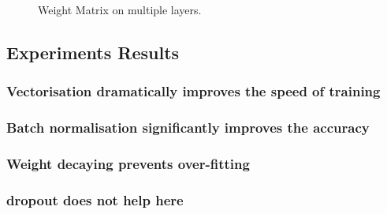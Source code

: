 \begin{figure}
    \caption{\label{fig:my-label3}Weight Matrix on multiple layers.}
\end{figure}


\subsection{Experiments Results}
\subsubsection{Vectorisation dramatically improves the speed of training}
\subsubsection{Batch normalisation significantly improves the accuracy}
\subsubsection{Weight decaying prevents over-fitting}
\subsubsection{dropout does not help here}
